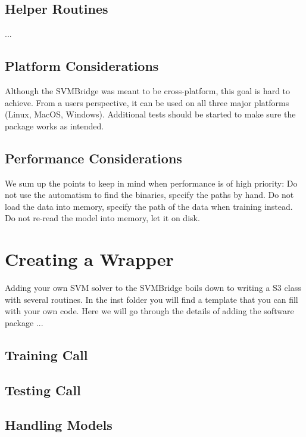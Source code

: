 \documentclass[article, shortnames]{jss}
\begin{document}
\subsection{Helper Routines}

...

\subsection{Platform Considerations}

Although the SVMBridge was meant to be cross-platform, this goal
is hard to achieve. From a users perspective, it can be used on all three
major platforms (Linux, MacOS, Windows). Additional tests should
be started to make sure the package works as intended.


\subsection{Performance Considerations}

We sum up the points to keep in mind when performance is of high priority:
Do not use the automatism to find the binaries, specify the paths by hand.
Do not load the data into memory, specify the path of the data when training instead.
Do not re-read the model into memory, let it on disk.



\section{Creating a Wrapper}

Adding your own SVM solver to the SVMBridge boils down to
writing a S3 class with several routines. In the inst folder you will find
a template that you can fill with your own code. Here we will go
through the details of adding the software package ...

\subsection{Training Call}

\subsection{Testing Call}

\subsection{Handling Models}
\end{document}
